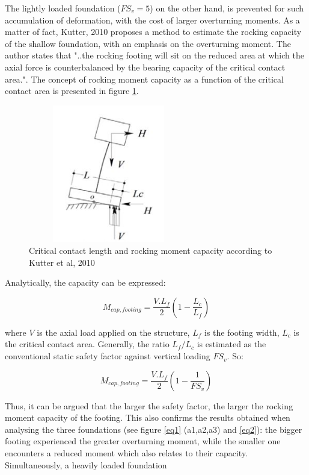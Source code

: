  The lightly loaded foundation ($FS_v=5$) on the other hand, is prevented for such accumulation of deformation, with the cost of larger overturning moments. As a matter of fact, Kutter, 2010 \cite{kutter2010estimation} proposes a method to estimate the rocking capacity of the shallow foundation, with an emphasis on the overturning moment. The author states that "..the rocking footing will sit on the reduced area at which the axial force is counterbalanced by the bearing capacity of the critical contact area.". The concept of rocking moment capacity as a function of the critical contact area is presented in figure \ref{rocking_cap}.
 \begin{figure}
 	\centering
 	\includegraphics[width=7cm,height=6cm, keepaspectratio]{"rocking_cap"}
 	\caption{Critical contact length and rocking moment capacity according to \mbox{Kutter} et al, 2010}
 	\label{rocking_cap}
 \end{figure}
 
  Analytically, the capacity can be expressed: 
  
  \begin{equation}
  M_{cap,footing} = \frac{V.L_f}{2}(1-\frac{L_c}{L_f})
  \end{equation}
  
  where $V$ is the axial load applied on the structure, $L_f$ is the footing width, $L_c$ is the critical contact area. Generally, the ratio $L_f/L_c$ is estimated as the conventional static safety factor against vertical loading $FS_v$. So:
  
  \begin{equation}
  M_{cap,footing} = \frac{V.L_f}{2}(1-\frac{1}{FS_v})
  \end{equation} 	
 
 Thus, it can be argued that the larger the safety factor, the larger the rocking moment capacity of the footing. This also confirms the results obtained when analysing the three foundations (see figure \ref{eq1} (a1,a2,a3) and \ref{eq2}): the bigger footing experienced the greater overturning moment, while the smaller one encounters a reduced moment which also relates to their capacity. Simultaneously, a heavily loaded foundation 
 
